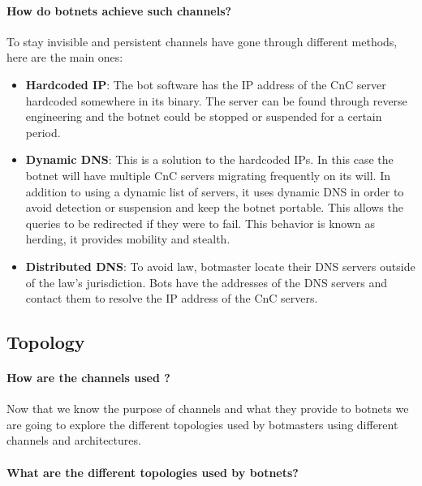 \paragraph{How do botnets achieve such channels?}
\cite{detection5}
\cite{bot-threat}
To stay invisible and persistent channels have gone through different methods, here are the main ones: 
\begin{itemize}[noitemsep]
\item \textbf{Hardcoded IP}: The bot software has the IP address of the CnC server hardcoded somewhere in its binary. The server can be found through reverse engineering and the botnet could be stopped or suspended for a certain period.
\item \textbf{Dynamic DNS}: This is a solution to the hardcoded IPs. In this case the botnet will have multiple CnC servers migrating frequently on its will. In addition to using a dynamic list of servers, it uses dynamic DNS in order to avoid detection or suspension and keep the botnet portable. This allows the queries to be redirected if they were to fail. This behavior is known as herding, it provides mobility and stealth.
\item \textbf{Distributed DNS}: To avoid law, botmaster locate their DNS servers outside of the law's jurisdiction. Bots have the addresses of the DNS servers and contact them to resolve the IP address of the CnC servers.
\end{itemize}

\subsection{Topology}
\paragraph{How are the channels used ?}
Now that we know the purpose of channels and what they provide to botnets we are going to explore the different topologies used by botmasters using different channels and architectures.

\paragraph{What are the different topologies used by botnets?}


